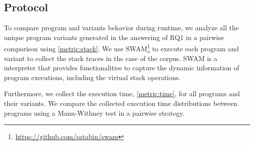 
\subsection*{Protocol}

To compare program and variants behavior during runtime, we analyze all the unique program variants generated in the answering of RQ1 in a pairwise comparison using \autoref{metric:stack}. We use SWAM\footnote{\url{https://github.com/satabin/swam}} to execute each program and variant to collect the stack traces in the case of the \corpusrosetta corpus. SWAM is a \wasm interpreter that provides functionalities to capture the dynamic information of \wasm program executions, including the virtual stack operations. 

Furthermore, we collect the execution time, \autoref{metric:time}, for all programs and their variants. We compare the collected execution time distributions between programs using a Mann-Withney test \cite{mann1947} in a pairwise strategy.


 